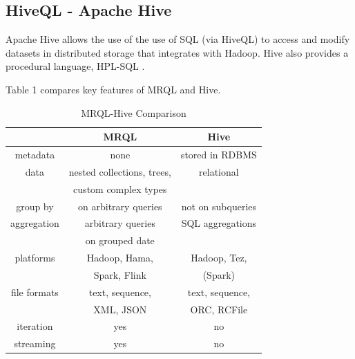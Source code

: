 \documentclass[9pt,twocolumn,twoside]{../../styles/osajnl}
\begin{document}
\subsection{HiveQL - Apache Hive}

Apache Hive allows the use of the use of SQL (via HiveQL) to access and modify datasets in distributed storage that integrates with Hadoop.  Hive also provides a procedural language, HPL-SQL \cite{www-apachehive}.

Table 1 compares key features of MRQL and Hive.

\begin{table}[ht]
\begin{center}
 \begin{tabular} {| c | c | c |}

 \hline
  & MRQL &  Hive \\ [0.5ex] 
 \hline

    
metadata     &    none & stored in RDBMS \\
 \hline
data &  nested collections, trees,             &       relational \\
&  custom complex types & \\
 \hline
group by      &   on arbitrary queries           &               not on subqueries \\
 \hline
aggregation   &     arbitrary queries            &               SQL aggregations \\
   &     on grouped date            &     \\

 \hline
platforms  &     Hadoop, Hama,           &     Hadoop, Tez, \\
  &     Spark, Flink           &      (Spark) \\
 \hline
file formats & text, sequence,  &  text, sequence, \\
 & XML, JSON  &  ORC, RCFile \\
 \hline
iteration     &     yes         &  no \\ 
 \hline
streaming     &     yes         &  no \\ 
[1ex] 
 \hline
\end{tabular}
\end{center}
  \caption{MRQL-Hive Comparison \cite{www-mrqpresent}}
\end{table}




\end{document}
